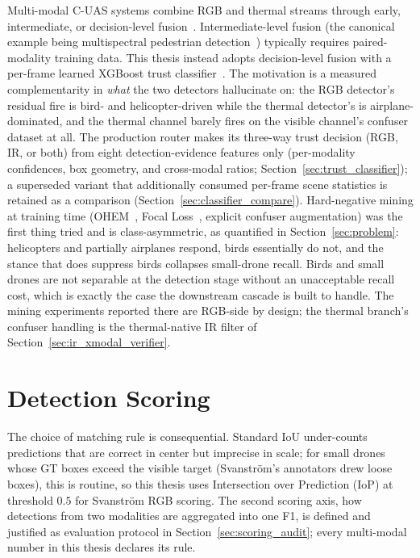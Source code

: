 Multi-modal C-UAS systems combine RGB and thermal streams through early, intermediate, or decision-level fusion~\cite{ramachandram2017fusion}. Intermediate-level fusion (the canonical example being multispectral pedestrian detection~\cite{wagner2016multispectral}) typically requires paired-modality training data. This thesis instead adopts decision-level fusion with a per-frame learned XGBoost trust classifier~\cite{chen2016xgboost,friedman2001greedy}. The motivation is a measured complementarity in \emph{what} the two detectors hallucinate on: the RGB detector's residual fire is bird- and helicopter-driven while the thermal detector's is airplane-dominated, and the thermal channel barely fires on the visible channel's confuser dataset at all. The production router makes its three-way trust decision (RGB, IR, or both) from eight detection-evidence features only (per-modality confidences, box geometry, and cross-modal ratios; Section~\ref{sec:trust_classifier}); a superseded variant that additionally consumed per-frame scene statistics is retained as a comparison (Section~\ref{sec:classifier_compare}). Hard-negative mining at training time (OHEM~\cite{shrivastava2016ohem}, Focal Loss~\cite{lin2017focal}, explicit confuser augmentation) was the first thing tried and is class-asymmetric, as quantified in Section~\ref{sec:problem}: helicopters and partially airplanes respond, birds essentially do not, and the stance that does suppress birds collapses small-drone recall. Birds and small drones are not separable at the detection stage without an unacceptable recall cost, which is exactly the case the downstream cascade is built to handle. The mining experiments reported there are RGB-side by design; the thermal branch's confuser handling is the thermal-native IR filter of Section~\ref{sec:ir_xmodal_verifier}.

\section{Detection Scoring}
\label{sec:lit_calibration}

The choice of matching rule is consequential. Standard IoU under-counts predictions that are correct in center but imprecise in scale; for small drones whose GT boxes exceed the visible target (Svanstr\"om's annotators drew loose boxes), this is routine, so this thesis uses Intersection over Prediction (IoP) at threshold $0.5$ for Svanstr\"om RGB scoring. The second scoring axis, how detections from two modalities are aggregated into one F1, is defined and justified as evaluation protocol in Section~\ref{sec:scoring_audit}; every multi-modal number in this thesis declares its rule.

